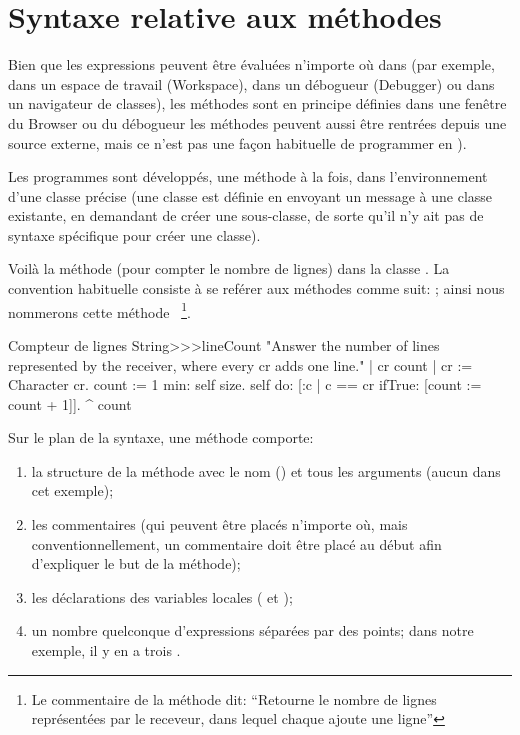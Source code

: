 \documentclass[a4paper,10pt,twoside]{book}
\begin{document}
\section{Syntaxe relative aux méthodes}
Bien que les expressions peuvent être évaluées n'importe
où dans \pharo (par exemple, dans un espace de travail (Workspace),
dans un débogueur (Debugger) ou dans un navigateur de classes), 
les méthodes sont en principe définies dans une fenêtre du
Browser ou du débogueur
les méthodes peuvent aussi être rentrées %
depuis une source externe, mais ce n'est pas une façon habituelle de programmer en \pharo).

Les programmes sont développés, une méthode à la fois,
dans l'environnement d'une classe précise (une classe est définie en envoyant 
un message à une classe existante, en demandant de créer une sous-classe, de sorte 
qu'il n'y ait pas de syntaxe spécifique pour créer une classe).

Voilà la méthode  (pour compter le
nombre de lignes) dans la classe  .
La convention habituelle consiste à se reférer aux méthodes
comme suit: ; ainsi nous nommerons cette
méthode ~\footnote{Le commentaire de la
  méthode dit: 
``Retourne le nombre de lignes représentées par le receveur, dans
    lequel chaque  ajoute une ligne''}.

\begin{method}[lineCount]{Compteur de lignes}
String>>>lineCount
   "Answer the number of lines represented by the receiver,
   where every cr adds one line."
   | cr count |
   cr := Character cr.
   count := 1  min: self size.
   self do:
      [:c | c == cr ifTrue: [count := count + 1]].
   ^ count
\end{method}

Sur le plan de la syntaxe, une méthode comporte:
\begin{enumerate}
  \item la structure de la méthode avec le nom (\ie {}) et tous les arguments (aucun dans cet exemple);
  \item les commentaires (qui peuvent être placés n'importe
    où, mais conventionnellement, un commentaire doit être placé au début afin d'expliquer le but de la méthode);
  \item les déclarations des variables locales (\ie {} et
    ); 
  \item un nombre quelconque d'expressions séparées par des points; dans notre exemple, il y en a trois .
\end{enumerate}
\end{document}
